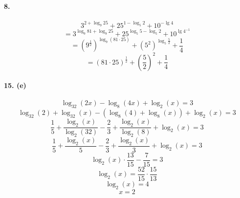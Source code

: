 \documentclass[12pt,a4paper,fleqn]{article}
\begin{document}
\textbf{8.} \\\\
$$ 3^{2+\log_9 25} + 25^{1-\log_5 2} + 10^{-\lg 4} $$
$$ = 3^{\log_9 81 + \log_9 25} + 25^{\log_5 5 - \log_5 2} + 10^{\lg 4^{-1}} $$
$$ = \left(9^{\frac{1}{2}}\right)^{\log_9 (81 \cdot 25)} + \left(5^2\right)^{\log_5 \frac{5}{2}} + \dfrac{1}{4} $$
$$ = (81 \cdot 25)^{\frac{1}{2}} + \left(\dfrac{5}{2}\right)^2 + \dfrac{1}{4} $$ \\
\textbf{15. (e)} \\\\
$$ \log_{32} (2x) - \log_8 (4x) + \log_2 (x) = 3 $$
$$ \log_{32} (2) + \log_{32} (x) - (\log_8 (4) + \log_8 (x)) + \log_2 (x) = 3 $$
$$ \dfrac{1}{5} + \dfrac{\log_2 (x)}{\log_2 (32)} - \dfrac{2}{3} + \dfrac{\log_2 (x)}{\log_2 (8)} + \log_2 (x) = 3$$
$$ \dfrac{1}{5} + \dfrac{\log_2 (x)}{5} - \dfrac{2}{3} + \dfrac{\log_2 (x)}{3} + \log_2 (x) = 3 $$
$$ \log_2 (x) \cdot \dfrac{13}{15} - \dfrac{7}{15} = 3 $$
$$ \log_2 (x) = \dfrac{52}{15} \cdot \dfrac{15}{13} $$
$$ \log_2 (x) = 4 $$
$$ x = 2 $$
\end{document}

